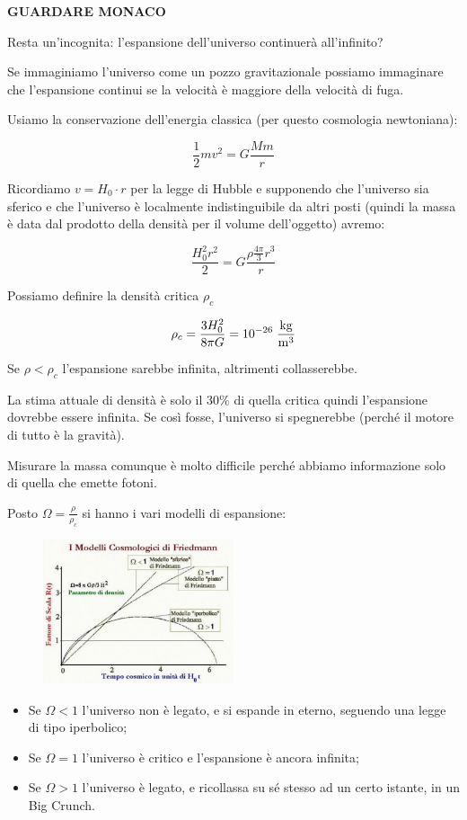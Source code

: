 \textbf{GUARDARE MONACO}

Resta un'incognita: l'espansione dell'universo continuerà all'infinito?

Se immaginiamo l'universo come un pozzo gravitazionale possiamo immaginare che l'espansione continui se la velocità è maggiore della velocità di fuga.

Usiamo la conservazione dell'energia classica (per questo cosmologia newtoniana):

$$\frac{1}{2}mv^2=G\frac{Mm}{r}$$

Ricordiamo $v=H_0 \cdot r$ per la legge di Hubble e supponendo che l'universo sia sferico e che l'universo è localmente indistinguibile da altri posti (quindi la massa è data dal prodotto della densità per il volume dell'oggetto) avremo:

$$\frac{H_0^2r^2}{2}=G\frac{\rho\frac{4\pi}{3}r^3}{r}$$

Possiamo definire la densità critica $\rho_c$

$$\rho_c=\frac{3H_0^2}{8\pi G}=10^{-26} \; \rm \frac{kg}{m^3}$$

Se $\rho<\rho_c$ l'espansione sarebbe infinita, altrimenti collasserebbe.

La stima attuale di densità è solo il 30\% di quella critica quindi l'espansione dovrebbe essere infinita. Se così fosse, l'universo si spegnerebbe (perché il motore di tutto è la gravità).

Misurare la massa comunque è molto difficile perché abbiamo informazione solo di quella che emette fotoni.

Posto $\Omega=\frac{\rho}{\rho_c}$ si hanno i vari modelli di espansione:

\begin{figure}[H]
    \centering
    \includegraphics[width=0.5\textwidth]{immagini16dic/cosmodelli.png}
\end{figure}

\begin{itemize}
    \item Se $\Omega<1$ l'universo non è legato, e si espande in eterno, seguendo una legge di tipo iperbolico;
    \item Se $\Omega=1$ l'universo è critico e l'espansione è ancora
    infinita;
    \item Se $\Omega>1$ l'universo è legato, e ricollassa su sé stesso ad un certo istante, in un Big Crunch.
\end{itemize}

